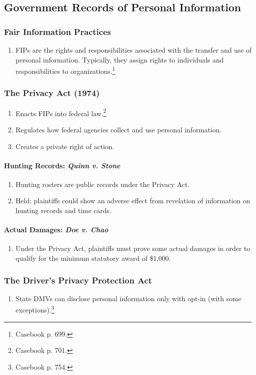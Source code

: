 \subsection{Government Records of Personal Information}

\subsubsection{Fair Information Practices}

\begin{enumerate}
    \item FIPs are the rights and responsibilities associated with the 
    transfer and use of personal information. Typically, they assign rights to 
    individuals and responsibilities to organizations.\footnote{Casebook p. 
    699.}
\end{enumerate}

\subsubsection{The Privacy Act (1974)}

\begin{enumerate}
    \item Enacts FIPs into federal law.\footnote{Casebook p. 701.}
    \item Regulates how federal agencies collect and use personal information.
    \item Creates a private right of action.
\end{enumerate}

\paragraph{Hunting Records: \emph{Quinn v. Stone}}

\begin{enumerate}
    \item Hunting rosters are public records under the Privacy Act.
    \item Held: plaintiffs could show an adverse effect from revelation of 
    information on hunting records and time cards.
\end{enumerate}

\paragraph{Actual Damages: \emph{Doe v. Chao}}

\begin{enumerate}
    \item Under the Privacy Act, plaintiffs must prove some actual damages 
    in order to qualify for the minimum statutory award of \$1,000.
\end{enumerate}

\subsubsection{The Driver's Privacy Protection Act}

\begin{enumerate}
    \item State DMVs can disclose personal information only with opt-in (with 
    some exceptions).\footnote{Casebook p. 754.}
\end{enumerate}
